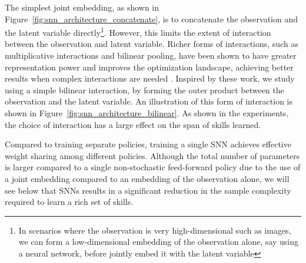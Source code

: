 \documentclass{article} %
\begin{document}
The simplest joint embedding, as shown in Figure~\ref{fig:snn_architecture_concatenate}, is to concatenate the observation and the latent variable directly\footnote{In scenarios where the observation is very high-dimensional such as images, we can form a low-dimensional embedding of the observation alone, say using a neural network, before jointly embed it with the latent variable}. However, this limits the extent of interaction between the observation and latent variable. Richer forms of interactions, such as multiplicative interactions and bilinear pooling, have been shown to have greater representation power and improves the optimization landscape, achieving better results when complex interactions are needed \citep{fukui2016multimodal, wu2016multiplicative}. Inspired by these work, we study using a simple bilinear interaction, by forming the outer product between the observation and the latent variable. An illustration of this form of interaction is shown in Figure~\ref{fig:snn_architecture_bilinear}. As shown in the experiments, the choice of interaction has a large effect on the span of skills learned. %


Compared to training separate policies, training a single SNN achieves effective weight sharing among different policies. Although the total number of parameters is larger compared to a single non-stochastic feed-forward policy due to the use of a joint embedding compared to an embedding of the observation alone, we will see below that SNNs results in a significant reduction in the sample complexity required to learn a rich set of skills.








\end{document}
